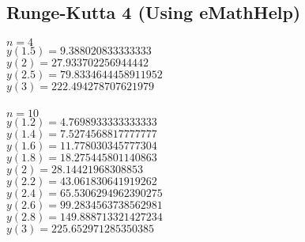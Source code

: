 \documentclass[12pt]{exam}
\begin{document}
\subsection*{Runge-Kutta 4 (Using eMathHelp)}
$n=4$\\
$y(1.5)=9.388020833333333$\\
$y(2)=27.933702256944442$\\
$y(2.5)=79.8334644458911952$\\
$y(3)=222.494278707621979$\\\\
$n=10$\\
$y(1.2)=4.7698933333333333$\\
$y(1.4)=7.5274568817777777$\\
$y(1.6)=11.778030345777304$\\
$y(1.8)=18.275445801140863$\\
$y(2)=28.14421968308853$\\
$y(2.2)=43.061830641919262$\\
$y(2.4)=65.5306294962390275$\\
$y(2.6)=99.2834563738562981$\\
$y(2.8)=149.888713321427234$\\
$y(3)=225.652971285350385$
\end{document}

